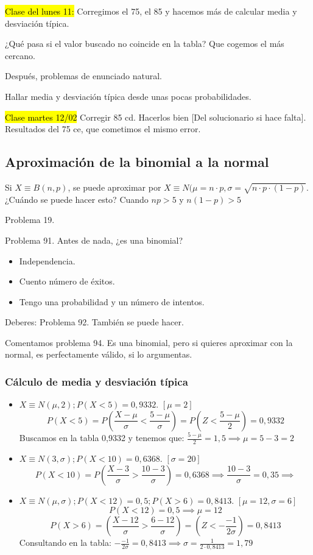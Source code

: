 \hl{Clase del lunes 11: } Corregimos el 75, el 85 y hacemos más de calcular media y desviación típica.

¿Qué pasa si el valor buscado no coincide en la tabla? Que cogemos el más cercano.

Después, problemas de enunciado natural.

Hallar media y desviación típica desde unas pocas probabilidades.

\hl{Clase martes 12/02}
Corregir 85 cd. Hacerlos bien [Del solucionario si hace falta].
Resultados del 75 ce, que cometimos el mismo error.


\subsection{Aproximación de la binomial a la normal}

Si $X\equiv B(n,p)$, se puede aproximar por $X\equiv N(\mu=n·p, \sigma=\sqrt{n·p·(1-p)}$. ¿Cuándo se puede hacer esto? Cuando $np>5$ y $n(1-p)>5$

Problema 19.

Problema 91. Antes de nada, ¿es una binomial? 
\begin{itemize}
	\item Independencia.
	\item Cuento número de éxitos.
	\item Tengo una probabilidad y un número de intentos.
\end{itemize}

Deberes: Problema 92. También se puede hacer.

Comentamos problema 94. Es una binomial, pero si quieres aproximar con la normal, es perfectamente válido, si lo argumentas.

\subsubsection{Cálculo de media y desviación típica}

\begin{itemize}
	\item $X\equiv N(\mu,2); P(X<5) = 0,9332$. $[\mu = 2]$
	\[
	P\left(X<5\right) = P\left(\frac{X-\mu}{\sigma}<\frac{5-\mu}{\sigma}\right) = P\left(Z<\frac{5-\mu}{2}\right) = 0,9332
	\]
	Buscamos en la tabla 0,9332 y tenemos que:
	$\frac{5-\mu}{2} = 1,5 \implies \mu=5-3=2$
	\item $X\equiv N(3,\sigma); P(X<10) = 0,6368$. $[\sigma = 20]$
	\[
		P\left(X<10\right) = P\left(\frac{X-3}{\sigma}>\frac{10-3}{\sigma}\right) =0,6368 \implies \frac{10-3}{\sigma}=0,35 \implies 
	\]
	\item $X\equiv N(\mu,\sigma); P(X<12) = 0,5; P(X>6) = 0,8413$. $[\mu = 12, \sigma = 6]$
	\[
		P(X<12) = 0,5 \implies \mu = 12
	\]
	\[
		P\left(X>6\right) = \left(\frac{X-12}{\sigma}>\frac{6-12}{\sigma}\right) = \left(Z<-\frac{-1}{2\sigma}\right) = 0,8413
	\]
	Consultando en la tabla: $-\frac{-1}{2\sigma} = 0,8413 \implies \sigma = \frac{1}{2·0,8413} = 1,79$
\end{itemize}




